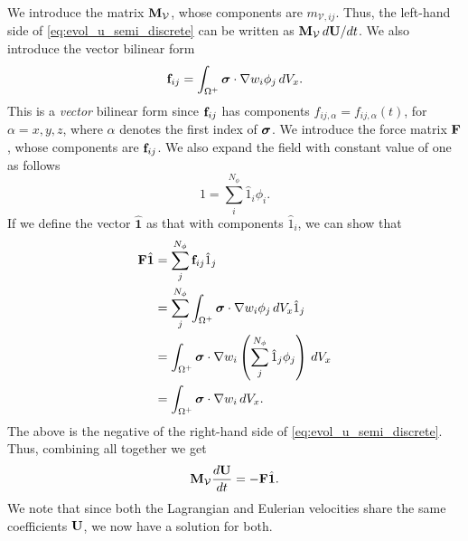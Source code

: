 \documentclass[11pt]{report}
\begin{document}
We introduce the matrix $\mathbf{M}_\mathcal{V}$, whose components are $m_{\mathcal{V},ij}$. Thus, the left-hand side of \cref{eq:evol_u_semi_discrete} can be written as $\mathbf{M}_\mathcal{V} \, d\mathbf{U} / dt$.
We also introduce the vector bilinear form
\begin{equation}
    \mathbf{f}_{ij} = \int_{\Omega^+} \bm \sigma \cdot \nabla w_i \phi_j \, dV_x.
\end{equation}
This is a \textit{vector} bilinear form since $\mathbf{f}_{ij}$ has components $f_{ij,\alpha} = f_{ij,\alpha}(t)$, for $\alpha = x,y,z$, where $\alpha$ denotes the first index of $\bm \sigma$. We introduce the force matrix $\mathbf{F}$, whose components are $\mathbf{f}_{ij}$. We also expand the field with constant value of one as follows
\begin{equation}
    1 = \sum_i^{N_\phi} \hat{1}_i \phi_i.
\end{equation}
If we define the vector $\hat{\mathbf{1}}$ as that with components $\hat{1}_i$, we can show that 
\begin{align}
    \mathbf{F} \hat{\mathbf{1}} &= \sum_j^{N_\phi} \mathbf{f}_{ij} \hat{1}_j \nonumber \\
    &= \sum_j^{N_\phi} \int_{\Omega^+} \bm \sigma \cdot \nabla w_i \phi_j \, dV_x \hat{1}_j \nonumber \\
    &= \int_{\Omega^+} \bm \sigma \cdot \nabla w_i \left ( \sum_j^{N_\phi} \hat{1}_j \phi_j \right ) \, dV_x \nonumber \\
    &= \int_{\Omega^+} \bm \sigma \cdot \nabla w_i \, dV_x.
\end{align}
The above is the negative of the right-hand side of \cref{eq:evol_u_semi_discrete}. Thus, combining all together we get
\begin{equation}
    \label{eq:evol_vel_semi_discrete}
    \mathbf{M}_\mathcal{V} \frac{d\mathbf{U}}{dt} = -\mathbf{F} \hat{\mathbf{1}}.
\end{equation}
We note that since both the Lagrangian and Eulerian velocities share the same coefficients $\mathbf{U}$, we now have a solution for both.

\end{document}
